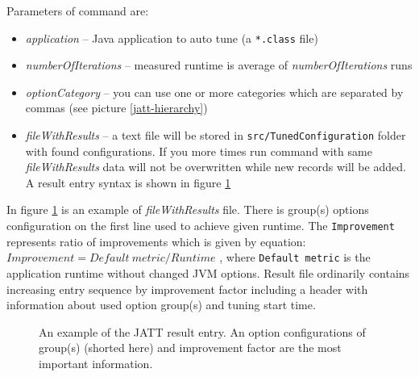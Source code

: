\documentclass[
  digital, %
  oneside,
  notable, %
  nolof,     %
  nolot     %
]{fithesis3}
\begin{document}
Parameters of command are:
\begin{itemize}
	\item \textit{application} -- Java application to auto tune (a \texttt{*.class} file)
	\item \textit{numberOfIterations} -- measured runtime is average of \textit{numberOfIterations} runs
	\item \textit{optionCategory} -- you can use one or more categories which are separated by commas (see picture \ref{jatt-hierarchy})
	\item \textit{fileWithResults} -- a text file will be stored in \texttt{src/TunedConfiguration} folder with found configurations. If you more times run command with same \textit{fileWithResults} data will not be overwritten while new records will be added. A result entry syntax is shown in figure \ref{jatt-result}
\end{itemize}

In figure \ref{jatt-result} is an example of \textit{fileWithResults} file. There is group(s) options configuration on the first line used to achieve given runtime. The \texttt{Improvement} represents ratio of improvements which is given by equation: $Improvement = Default\ metric / Runtime$ \cite{jatt-web-dzone}, where \texttt{Default metric} is the application runtime without changed JVM options. Result file ordinarily contains increasing entry sequence by improvement factor including a header with information about used option group(s) and tuning start time.
\begin{figure}[h]
	\caption{An example of the JATT result entry. An option configurations of group(s) (shorted here) and improvement factor are the most important information.}
	\label{jatt-result}
\end{figure}
\end{document}
